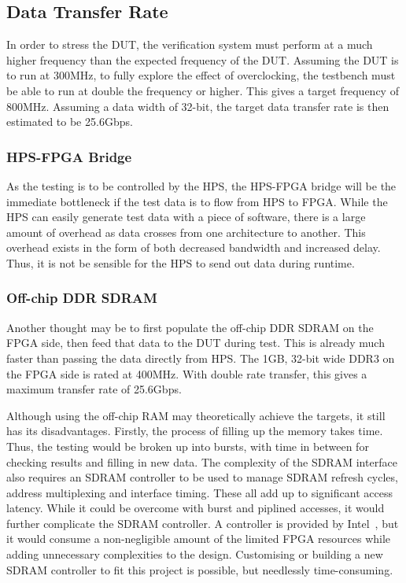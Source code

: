 \subsection{Data Transfer Rate}
In order to stress the DUT, the verification system must perform at a much
higher frequency than the expected frequency of the DUT.
Assuming the DUT is to run at 300MHz, to fully explore the effect of
overclocking, the testbench must be able to run at double the frequency or
higher.
This gives a target frequency of 800MHz.
Assuming a data width of 32-bit, the target data transfer rate is then 
estimated to be 25.6Gbps.

\subsubsection{\textbf{HPS-FPGA Bridge}}
As the testing is to be controlled by the HPS, the HPS-FPGA bridge will be the
immediate bottleneck if the test data is to flow from HPS to FPGA.
While the HPS can easily generate test data with a piece of software,
there is a large amount of overhead as data crosses from one architecture
to another.
This overhead exists in the form of both decreased bandwidth and increased
delay.
Thus, it is not be sensible for the HPS to send out data during runtime.

\subsubsection{\textbf{Off-chip DDR SDRAM}}
Another thought may be to first populate the off-chip DDR SDRAM on the FPGA
side, then feed that data to the DUT during test.
This is already much faster than passing the data directly from HPS.
The 1GB, 32-bit wide DDR3 on the FPGA side is rated at 400MHz.
With double rate transfer, this gives a maximum transfer rate of 25.6Gbps.

Although using the off-chip RAM may theoretically achieve the targets,
it still has its disadvantages.
Firstly, the process of filling up the memory takes time.
Thus, the testing would be broken up into bursts, with time in between for
checking results and filling in new data.
The complexity of the SDRAM interface also requires an SDRAM controller to be
used to manage SDRAM refresh cycles, address multiplexing and interface timing.
These all add up to significant access latency.
While it could be overcome with burst and piplined accesses,
it would further complicate the SDRAM controller.
A controller is provided by Intel~\cite{Altera3}, but it would consume
a non-negligible amount of the limited FPGA resources while adding
unnecessary complexities to the design.
Customising or building a new SDRAM controller to fit this project is possible,
but needlessly time-consuming.

